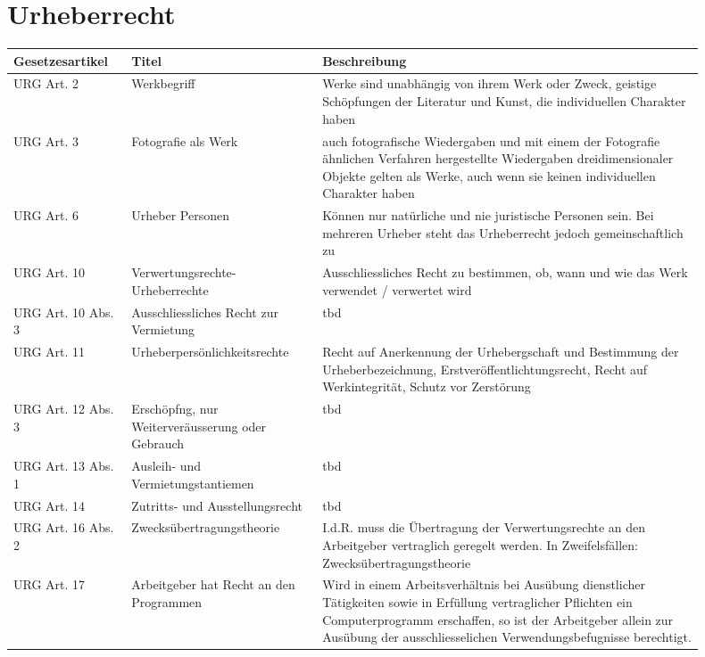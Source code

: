 \documentclass{report}
\theoremstyle{definition}
\theoremstyle{example}
\begin{document}
\section{Urheberrecht}
\begin{tabular}[h]{p{0.15\linewidth}|p{0.25\linewidth}|p{0.50\linewidth}}
   \textbf{Gesetzesartikel} & \textbf{Titel} & \textbf{Beschreibung} \\
   \hline
   URG Art. 2 & Werkbegriff & Werke sind unabhängig von ihrem Werk oder Zweck, geistige Schöpfungen der Literatur und Kunst, die individuellen Charakter haben \\
   \hline
    URG Art. 3 & Fotografie als Werk & auch fotografische Wiedergaben und mit einem der Fotografie ähnlichen Verfahren hergestellte Wiedergaben dreidimensionaler Objekte gelten als Werke, auch wenn sie keinen individuellen Charakter haben \\
   \hline 
   URG Art. 6 & Urheber Personen & Können nur natürliche und nie juristische Personen sein. Bei mehreren Urheber steht das Urheberrecht jedoch gemeinschaftlich zu \\
   \hline
   URG Art. 10 & Verwertungsrechte-Urheberrechte & Ausschliessliches Recht zu bestimmen, ob, wann und wie das Werk verwendet / verwertet wird \\
   \hline
   URG Art. 10 Abs. 3 & Ausschliessliches Recht zur Vermietung & tbd \\
   \hline
   URG Art. 11 & Urheberpersönlichkeitsrechte & Recht auf Anerkennung der Urhebergschaft und Bestimmung der Urheberbezeichnung, Erstveröffentlichtungsrecht, Recht auf Werkintegrität, Schutz vor Zerstörung\\
   \hline
   URG Art. 12 Abs. 3 & Erschöpfng, nur Weiterveräusserung oder Gebrauch & tbd \\
   \hline
   URG Art. 13 Abs. 1 & Ausleih- und Vermietungstantiemen & tbd \\
   \hline
   URG Art. 14 & Zutritts- und Ausstellungsrecht & tbd\\
   \hline
   URG Art. 16 Abs. 2 & Zwecksübertragungstheorie & I.d.R. muss die Übertragung der Verwertungsrechte an den Arbeitgeber vertraglich geregelt werden. In Zweifelsfällen: Zwecksübertragungstheorie\\
   \hline
   URG Art. 17 & Arbeitgeber hat Recht an den Programmen &  Wird in einem Arbeitsverhältnis bei Ausübung dienstlicher Tätigkeiten sowie in Erfüllung vertraglicher Pflichten ein Computerprogramm erschaffen, so ist der Arbeitgeber allein zur Ausübung der ausschliesselichen Verwendungsbefugnisse berechtigt. \\

\end{tabular}
\end{document}
